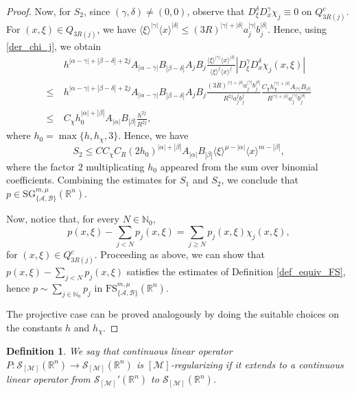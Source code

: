 \documentclass[11pt,reqno]{amsart}
\numberwithin{equation}{section}
\newtheorem{definition}[theorem]{Definition}
\newcommand{\R}{{\mathbb{R}}} %
\newcommand{\N}{{\mathbb{N}}} %
\newcommand{\caS}{{\mathcal{S}}}
\newcommand{\SG}{{\mathrm{SG}}}
\newcommand{\FS}{{\mathrm{FS}}}
\newcommand{\M}{{\mathcal{M}}} %
\newcommand{\A}{{\mathcal{A}}} %
\newcommand{\B}{{\mathcal{B}}} %
\begin{document}
\begin{proof}
	Now, for $S_2$, since $(\gamma,\delta)\neq (0,0)$, observe that $D_\xi^\delta D_x^\gamma\chi_j\equiv 0$ on $Q_{3R(j)}^c$. For $(x,\xi)\in Q_{3R(j)}$, we have $\langle\xi\rangle^{|\gamma|}\langle x\rangle^{|\delta|}\leq (3R)^{|\gamma|+|\delta|}a_j^{|\gamma|}b_j^{|\delta|}$. Hence, using \eqref{der_chi_j}, we obtain
	\begin{align*}
		& h^{|\alpha-\gamma|+|\beta-\delta|+2j}A_{|\alpha-\gamma|}B_{|\beta-\delta|} A_jB_j \frac{\langle\xi\rangle^{|\gamma|}\langle x\rangle^{|\delta|} }{\langle\xi\rangle^j\langle x\rangle^j}|D_\xi^\gamma D_x^\delta\chi_j(x,\xi)|\\
		\leq\ & h^{|\alpha-\gamma|+|\beta-\delta|+2j} A_{|\alpha-\gamma|} B_{|\beta-\delta|}A_jB_j\frac{ (3R)^{|\gamma|+|\delta|}a_j^{|\gamma|}b_j^{|\delta|}}{R^{2j}a_j^j b_j^j} \frac{C_\chi h_\chi^{|\gamma|+|\delta|} A_{|\gamma|}B_{|\delta|}}{R^{|\gamma|+|\delta|}a_j^{|\gamma|}b_j^{|\delta|}}\\
		\leq\ & C_\chi h_0^{|\alpha|+|\beta|}A_{|\alpha|}B_{|\beta|} \frac{h^{2j}}{R^{2j}},
	\end{align*}
	where $h_0 = \max\{h,h_\chi,3\}$. Hence, we have
	\begin{equation*}
		S_2 \leq CC_\chi C_R (2h_0)^{|\alpha|+|\beta|}A_{|\alpha|}B_{|\beta|}\langle\xi\rangle^{\mu-|\alpha|}\langle x\rangle^{m-|\beta|},
	\end{equation*}
	where the factor $2$ multiplicating $h_0$ appeared from the sum over binomial coefficients. 
	Combining the estimates for $S_1$ and $S_2$, we conclude that $p\in {\SG}_{\{\A,\B\}}^{m,\mu}(\R^n)$.
	
	Now, notice that, for every $N\in\N_0$,
	\[p(x,\xi)-\sum_{j<N}p_j(x,\xi) = \sum_{j\geq N}p_j(x,\xi)\chi_j(x,\xi),\]
	for $(x,\xi)\in Q_{3R(j)}^c$. Proceeding as above, we can show that $p(x,\xi)-\sum_{j<N}p_j(x,\xi)$ satisfies the estimates of Definition \ref{def_equiv_FS}, hence $p\sim \sum_{j\in\N_0}p_j$ in $\FS_{\{\A,\B\}}^{m,\mu}(\R^n)$.
	
	The projective case can be proved analogously by doing the suitable choices on the constants $h$ and $h_\chi$.	 
\end{proof}



\begin{definition}
	We say that continuous linear operator $P:\caS_{[\M]}(\R^n)\to \caS_{[\M]}(\R^n)$ is $[\M]$-regularizing if it extends to a continuous linear operator from $\caS_{[\M]}'(\R^n)$ to $\caS_{[\M]}(\R^n)$.
\end{definition}
\end{document}
